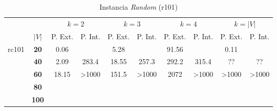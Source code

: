 \documentclass[12pt]{article}
\begin{document}
\vspace{1cm}

\begin{table}[!htb]
\centering
\small
\begin{tabular}{|c|c|c|c|c|c|c|c|c|c|}
\cline{3-10}
\multicolumn{2}{c}{} & \multicolumn{2}{|c}{$k=2$} & \multicolumn{2}{|c|}{$k=3$} & \multicolumn{2}{c|}{$k=4$} & \multicolumn{2}{c|}{$k=|V|$}\\
\cline{2-10}
\multicolumn{1}{c}{} & \multicolumn{1}{|c|}{$|V|$} & \multicolumn{1}{|c|}{P. Ext.} & \multicolumn{1}{|c|}{P. Int.} & \multicolumn{1}{|c|}{P. Ext.} & \multicolumn{1}{|c|}{P. Int.} & \multicolumn{1}{|c|}{P. Ext.} & \multicolumn{1}{|c|}{P. Int.} & \multicolumn{1}{|c|}{P. Ext.} & \multicolumn{1}{|c|}{P. Int.} \\
\hline
\multirow{5}{*}{rc101} & \textbf{20} & 0.06 &  & 5.28 &  & 91.56 &  & 0.11 & \\
\cline{2-10}
 & \textbf{40} & 2.09 & 283.4 & 18.55 & 257.3 & 292.2 & 315.4 & ?? & ?? \\
\cline{2-10}
& \textbf{60} & 18.15 & >1000 & 151.5 & >1000 & 2072 & >1000 & >1000 & >1000 \\
\cline{2-10}
& \textbf{80} &  &  &  &  &  &  &  & \\
\cline{2-10}
& \textbf{100} &  &  &  &  &  &  &  & \\ 
\hline
\end{tabular}
\caption{Instancia \emph{Random} (r101)}
\end{table}
\end{document}
